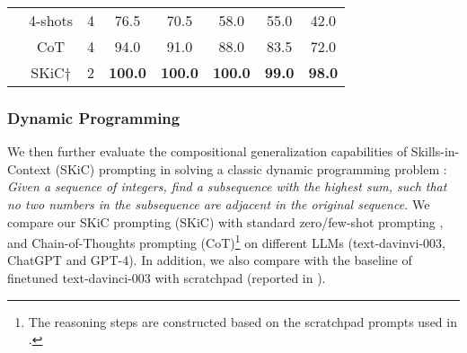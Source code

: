 \begin{table}[t]
\begin{tabular}{c|c|c|cc|ccc}
                          & 4-shots     &4       & 76.5                             & 70.5          & 58.0          & 55.0          & 42.0          \\
                          & CoT       &4         & 94.0                             & 91.0         & 88.0          & 83.5          & 72.0          \\
                          & SKiC$\dag$  &2             & \textbf{100.0}                    & \textbf{100.0} & \textbf{100.0} & \textbf{99.0} & \textbf{98.0} \\ \bottomrule
\end{tabular} 
\end{table}




\subsubsection{Dynamic Programming}
We then further evaluate the compositional generalization capabilities of Skills-in-Context (SKiC) prompting in solving a classic dynamic programming problem \citep{dziri2023faith}: \textit{Given a sequence of integers, find a subsequence with the highest sum, such that no two numbers in the subsequence are adjacent in the original sequence.} We compare our SKiC prompting (SKiC) with standard zero/few-shot prompting \citep{brown2020language}, and Chain-of-Thoughts prompting (CoT)\footnote{The reasoning steps are constructed based on the scratchpad prompts used in \citet{dziri2023faith}.}  \citep{wei2022chain} on different LLMs (text-davinvi-003, ChatGPT and GPT-4). In addition, we also compare with the baseline of finetuned text-davinci-003 with scratchpad (reported in \citet{dziri2023faith}).
